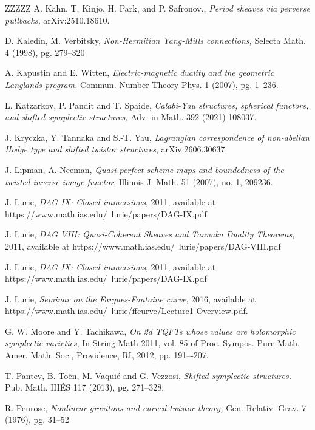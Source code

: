 \documentclass[11pt, a4paper]{amsart}
\numberwithin{equation}{section}
\theoremstyle{definition}
\theoremstyle{remark}
\begin{document}
\begin{thebibliography}{ZZZZZ}
A. Kahn, T. Kinjo, H. Park, and P. Safronov.,
\textit{Period sheaves via perverse pullbacks,}
arXiv:2510.18610.

D. Kaledin, M. Verbitsky,
\textit{Non-Hermitian Yang-Mills connections,}
Selecta Math. 4 (1998), pg. 279--320

A. Kapustin and E. Witten,
\textit{Electric-magnetic duality and the geometric Langlands program.}
Commun. Number Theory Phys. 1 (2007), pg. 1--236.

L. Katzarkov, P. Pandit and T. Spaide, 
\textit{Calabi-Yau structures, spherical functors, and shifted symplectic structures,}
Adv. in Math. 392 (2021) 108037.

 J. Kryczka, Y. Tannaka and S.-T. Yau, {\it Lagrangian correspondence of non-abelian Hodge type and shifted twistor structures}, arXiv:2606.30637.

J. Lipman, A. Neeman, 
\textit{Quasi-perfect scheme-maps and boundedness of the twisted inverse image functor}, 
Illinois J. Math. 51 (2007), no. 1, 209236.

 J. Lurie, {\it DAG IX: Closed immersions}, 2011, available at https://www.math.ias.edu/~lurie/papers/DAG-IX.pdf

 J. Lurie, {\it DAG VIII: Quasi-Coherent Sheaves and
Tannaka Duality Theorems}, 2011, available at https://www.math.ias.edu/~lurie/papers/DAG-VIII.pdf

 J. Lurie, {\it DAG IX: Closed immersions}, 2011, available at https://www.math.ias.edu/~lurie/papers/DAG-IX.pdf

 J. Lurie, {\it Seminar on the Fargues-Fontaine curve}, 2016, available at https://www.math.ias.edu/~lurie/ffcurve/Lecture1-Overview.pdf.

G. W. Moore and Y. Tachikawa, 
{\it On 2d TQFTs whose values are holomorphic symplectic varieties}, In String-Math
2011, vol. 85 of Proc. Sympos. Pure Math. Amer. Math. Soc., Providence, RI, 2012, pp. 191–-207.


T. Pantev, B. Toën, M. Vaqui\'e and G. Vezzosi, 
\textit{Shifted symplectic structures.}
Pub. Math. IHÉS 117 (2013), pg. 271--328. 

R. Penrose,
\textit{Nonlinear gravitons and curved twistor theory,}
Gen. Relativ. Grav. 7 (1976), pg. 31--52


\end{thebibliography}
\end{document}
